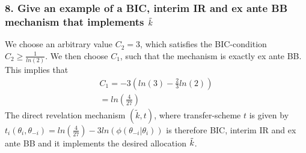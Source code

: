\documentclass[a4paper]{article}
\begin{document}
	
	\subsubsection*{8. Give an example of a BIC, interim IR and ex ante BB mechanism that implements $\Tilde{k}$}
	We choose an arbitrary value $C_2=3$, which satisfies the BIC-condition $C_2\geq \frac{1}{ln(2)}$. We then choose $C_1$, such that the mechanism is exactly ex ante BB. This implies that 
	\begin{align}
		C_1=-3(ln(3)-\frac{2}{3}ln(2))\nonumber\\
		=ln(\frac{4}{27})
	\end{align}
	The direct revelation mechanism $(\tilde{k},t)$, where transfer-scheme $t$ is given by $t_i(\theta_i,\theta_{-i})=ln(\frac{4}{27})-3ln(\phi(\theta_{-i}|\theta_{i}))$ is therefore BIC, interim IR and ex ante BB and it implements the desired allocation $\Tilde{k}$.

\fi
\end{document}

